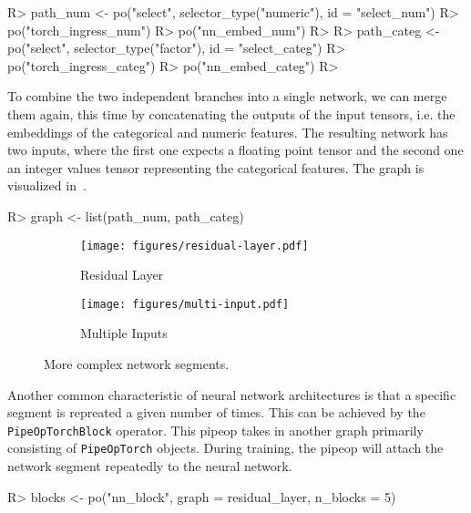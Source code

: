 \documentclass[article, nojss]{jss}
\theoremstyle{definition}
\begin{document}
\begin{CodeInput}
R> path_num <- po("select", selector_type("numeric"), id = "select_num") %
R>   po("torch_ingress_num") %
R>   po("nn_embed_num")
R> 
R> path_categ <- po("select", selector_type("factor"), id = "select_categ") %
R>   po("torch_ingress_categ") %
R>   po("nn_embed_categ")
R> 
\end{CodeInput}

To combine the two independent branches into a single network, we can merge them again, this time by concatenating the outputs of the input tensors, i.e. the embeddings of the categorical and numeric features.
The resulting network has two inputs, where the first one expects a floating point tensor and the second one an integer values tensor representing the categorical features.
The graph is visualized in~.

\begin{CodeInput}
R> graph <- list(path_num, path_categ) %
\end{CodeInput}

\begin{figure}[h]
    \centering
    \begin{subfigure}{0.38\textwidth}
        \centering
        \texttt{[image: figures/residual-layer.pdf]}
        \caption{Residual Layer}
        \label{fig:residual-layer}
    \end{subfigure}
    \hfill
    \begin{subfigure}{0.58\textwidth}
        \centering
        \texttt{[image: figures/multi-input.pdf]}
        \caption{Multiple Inputs}
        \label{fig:multi-inputs}
    \end{subfigure}
    \caption{More complex network segments.}
    \label{fig:side-by-side}
\end{figure}

Another common characteristic of neural network architectures is that a specific segment is repreated a given number of times.
This can be achieved by the \texttt{PipeOpTorchBlock} operator.
This pipeop takes in another graph primarily consisting of \texttt{PipeOpTorch} objects.
During training, the pipeop will attach the network segment repeatedly to the neural network.

\begin{CodeInput}
R> blocks <- po("nn_block", graph = residual_layer, n_blocks = 5)
\end{CodeInput}
\end{document}
